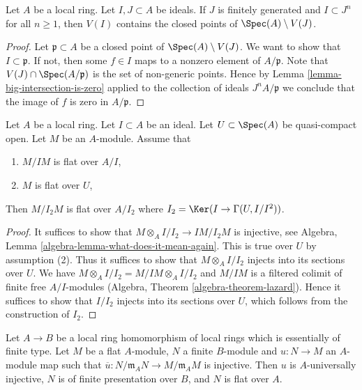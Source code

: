 \begin{lemma}
\label{lemma-closed-points-complement}
Let $A$ be a local ring. Let $I, J \subset A$ be ideals.
If $J$ is finitely generated and $I \subset J^n$ for all $n \geq 1$,
then $V(I)$ contains the closed points of $\Spec(A) \setminus V(J)$.
\end{lemma}

\begin{proof}
Let $\mathfrak p \subset A$ be a closed point of $\Spec(A) \setminus V(J)$.
We want to show that $I \subset \mathfrak p$. If not, then some $f \in I$
maps to a nonzero element of $A/\mathfrak p$. Note that
$V(J) \cap \Spec(A/\mathfrak p)$ is the set of non-generic points.
Hence by Lemma \ref{lemma-big-intersection-is-zero} applied
to the collection of ideals $J^nA/\mathfrak p$ we conclude that
the image of $f$ is zero in $A/\mathfrak p$.
\end{proof}

\begin{lemma}
\label{lemma-make-smaller-flatness-ideal}
Let $A$ be a local ring. Let $I \subset A$ be an ideal.
Let $U \subset \Spec(A)$ be quasi-compact open.
Let $M$ be an $A$-module. Assume that
\begin{enumerate}
\item $M/IM$ is flat over $A/I$,
\item $M$ is flat over $U$,
\end{enumerate}
Then $M/I_2M$ is flat over $A/I_2$ where
$I_2 = \Ker(I \to \Gamma(U, I/I^2))$.
\end{lemma}

\begin{proof}
It suffices to show that
$M \otimes_A I/I_2 \to IM/I_2M$ is injective, see
Algebra, Lemma \ref{algebra-lemma-what-does-it-mean-again}.
This is true over $U$ by assumption (2). Thus it suffices to show
that $M \otimes_A I/I_2$ injects into its sections over $U$.
We have $M \otimes_A I/I_2 = M/IM \otimes_A I/I_2$ and
$M/IM$ is a filtered colimit of finite free $A/I$-modules
(Algebra, Theorem \ref{algebra-theorem-lazard}).
Hence it suffices to show that $I/I_2$ injects into its sections
over $U$, which follows from the construction of $I_2$.
\end{proof}

\begin{proposition}
\label{proposition-finite-type-injective-into-flat-mod-m}
Let $A \to B$ be a local ring homomorphism of local rings
which is essentially of finite type. Let $M$ be a flat $A$-module,
$N$ a finite $B$-module and $u : N \to M$ an $A$-module map such that
$\overline{u} : N/\mathfrak m_AN \to M/\mathfrak m_AM$ is injective.
Then $u$ is $A$-universally injective, $N$ is of finite presentation over
$B$, and $N$ is flat over $A$.
\end{proposition}

